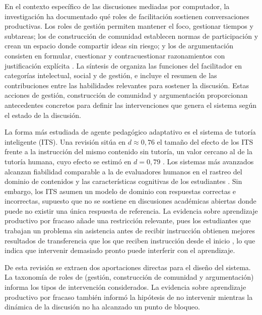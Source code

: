 En el contexto específico de las discusiones mediadas por computador, la investigación ha documentado qué roles de facilitación sostienen conversaciones productivas. Los roles de gestión permiten mantener el foco, gestionar tiempos y subtareas; los de construcción de comunidad establecen normas de participación y crean un espacio donde compartir ideas sin riesgo; y los de argumentación consisten en formular, cuestionar y contracuestionar razonamientos con justificación explícita \parencite{PilkingtonWalker2003}. La síntesis de \textcite{Abdous2011} organiza las funciones del facilitador en categorías intelectual, social y de gestión, e incluye el resumen de las contribuciones entre las habilidades relevantes para sostener la discusión. Estas acciones de gestión, construcción de comunidad y argumentación proporcionan antecedentes concretos para definir las intervenciones que genera el sistema según el estado de la discusión.

La forma más estudiada de agente pedagógico adaptativo es el sistema de tutoría inteligente (ITS). Una revisión sitúa en $d \approx 0{,}76$ el tamaño del efecto de los ITS frente a la instrucción del mismo contenido sin tutoría, un valor cercano al de la tutoría humana, cuyo efecto se estimó en $d=0{,}79$ \parencite{VanLehn2011}. Los sistemas más avanzados alcanzan fiabilidad comparable a la de evaluadores humanos en el rastreo del dominio de contenidos y las características cognitivas de los estudiantes \parencite{GraesserEtAl2017}. Sin embargo, los ITS asumen un modelo de dominio con respuestas correctas e incorrectas, supuesto que no se sostiene en discusiones académicas abiertas donde puede no existir una única respuesta de referencia. La evidencia sobre aprendizaje productivo por fracaso añade una restricción relevante, pues los estudiantes que trabajan un problema sin asistencia antes de recibir instrucción obtienen mejores resultados de transferencia que los que reciben instrucción desde el inicio \parencite{Kapur2016}, lo que indica que intervenir demasiado pronto puede interferir con el aprendizaje.

De esta revisión se extraen dos aportaciones directas para el diseño del sistema. La taxonomía de roles de \textcite{PilkingtonWalker2003} (gestión, construcción de comunidad y argumentación) informa los tipos de intervención considerados. La evidencia sobre aprendizaje productivo por fracaso \parencite{Kapur2016} también informó la hipótesis de no intervenir mientras la dinámica de la discusión no ha alcanzado un punto de bloqueo.

